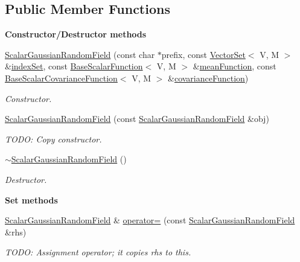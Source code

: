 \subsection*{Public Member Functions}
\begin{Indent}{\bf Constructor/\-Destructor methods}\par
\begin{DoxyCompactItemize}
\item 
\hyperlink{class_q_u_e_s_o_1_1_scalar_gaussian_random_field_a97e289939e97f5280dd29cda787bbcbb}{Scalar\-Gaussian\-Random\-Field} (const char $\ast$prefix, const \hyperlink{class_q_u_e_s_o_1_1_vector_set}{Vector\-Set}$<$ V, M $>$ \&\hyperlink{class_q_u_e_s_o_1_1_scalar_gaussian_random_field_ac4edd4b4742e09be69e8f0aab3ecb6c6}{index\-Set}, const \hyperlink{class_q_u_e_s_o_1_1_base_scalar_function}{Base\-Scalar\-Function}$<$ V, M $>$ \&\hyperlink{class_q_u_e_s_o_1_1_scalar_gaussian_random_field_ac2421f1e67dc7a0052cdebfaf464421e}{mean\-Function}, const \hyperlink{class_q_u_e_s_o_1_1_base_scalar_covariance_function}{Base\-Scalar\-Covariance\-Function}$<$ V, M $>$ \&\hyperlink{class_q_u_e_s_o_1_1_scalar_gaussian_random_field_a3b8e2cce1f6fff8383de2325dc2981b5}{covariance\-Function})
\begin{DoxyCompactList}\small\item\em Constructor. \end{DoxyCompactList}\item 
\hyperlink{class_q_u_e_s_o_1_1_scalar_gaussian_random_field_ad0ae533f9f30c4d38ea9244accb91838}{Scalar\-Gaussian\-Random\-Field} (const \hyperlink{class_q_u_e_s_o_1_1_scalar_gaussian_random_field}{Scalar\-Gaussian\-Random\-Field} \&obj)
\begin{DoxyCompactList}\small\item\em T\-O\-D\-O\-: Copy constructor. \end{DoxyCompactList}\item 
\hyperlink{class_q_u_e_s_o_1_1_scalar_gaussian_random_field_a913f644a4ba78c2d4f538802c743a20e}{$\sim$\-Scalar\-Gaussian\-Random\-Field} ()
\begin{DoxyCompactList}\small\item\em Destructor. \end{DoxyCompactList}\end{DoxyCompactItemize}
\end{Indent}
\begin{Indent}{\bf Set methods}\par
\begin{DoxyCompactItemize}
\item 
\hyperlink{class_q_u_e_s_o_1_1_scalar_gaussian_random_field}{Scalar\-Gaussian\-Random\-Field} \& \hyperlink{class_q_u_e_s_o_1_1_scalar_gaussian_random_field_aebc3cec0fcb380ef912332a2eec8724c}{operator=} (const \hyperlink{class_q_u_e_s_o_1_1_scalar_gaussian_random_field}{Scalar\-Gaussian\-Random\-Field} \&rhs)
\begin{DoxyCompactList}\small\item\em T\-O\-D\-O\-: Assignment operator; it copies {\ttfamily rhs} to {\ttfamily this}. \end{DoxyCompactList}\end{DoxyCompactItemize}
\end{Indent}
